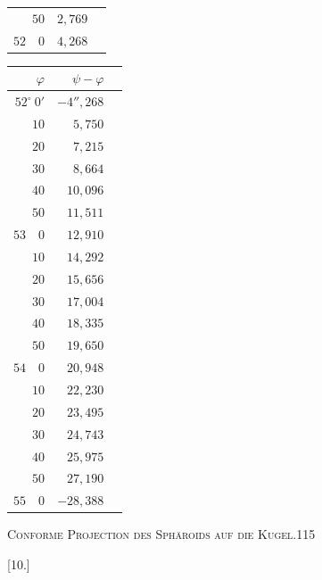\begin{center}
\begin{tabular}[t]{|r|r|r|}
$50$&$2{,}769$&\raisebox{-.7\baselineskip}{\small$1{,}499$}\\
$52\quad0$&$4{,}268$&
\end{tabular}\qquad
\begin{tabular}[t]{|r|r|r|}
\hline
$\varphi$&$\psi-\varphi$&\\\hline\hline
$52^\circ\ 0'$&$-4''{,}268$&\raisebox{-.7\baselineskip}{\small$1{,}482$}\\
$10$&$5{,}750$&\raisebox{-.7\baselineskip}{\small$1{,}465$}\\
$20$&$7{,}215$&\raisebox{-.7\baselineskip}{\small$1{,}449$}\\
$30$&$8{,}664$&\raisebox{-.7\baselineskip}{\small$1{,}432$}\\
$40$&$10{,}096$&\raisebox{-.7\baselineskip}{\small$1{,}415$}\\
$50$&$11{,}511$&\raisebox{-.7\baselineskip}{\small$1{,}399$}\\
$53\quad0$&$12{,}910$&\raisebox{-.7\baselineskip}{\small$1{,}382$}\\
$10$&$14{,}292$&\raisebox{-.7\baselineskip}{\small$1{,}364$}\\
$20$&$15{,}656$&\raisebox{-.7\baselineskip}{\small$1{,}348$}\\
$30$&$17{,}004$&\raisebox{-.7\baselineskip}{\small$1{,}331$}\\
$40$&$18{,}335$&\raisebox{-.7\baselineskip}{\small$1{,}315$}\\
$50$&$19{,}650$&\raisebox{-.7\baselineskip}{\small$1{,}298$}\\
$54\quad0$&$20{,}948$&\raisebox{-.7\baselineskip}{\small$1{,}282$}\\
$10$&$22{,}230$&\raisebox{-.7\baselineskip}{\small$1{,}265$}\\
$20$&$23{,}495$&\raisebox{-.7\baselineskip}{\small$1{,}248$}\\
$30$&$24{,}743$&\raisebox{-.7\baselineskip}{\small$1{,}232$}\\
$40$&$25{,}975$&\raisebox{-.7\baselineskip}{\small$1{,}215$}\\
$50$&$27{,}190$&\raisebox{-.7\baselineskip}{\small$1{,}198$}\\
$55\quad0$&$-28{,}388$&
\end{tabular}
\par\endgroup
\end{center}
\clearpage
\noindent\mbox{}\hfill{\small\textsc{Conforme Projection des Sphäroids auf die Kugel.}}\hfill115\par\bigskip
\begin{center}[10.]\end{center}
